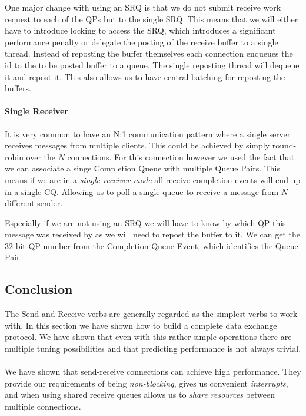 One major change with using an SRQ is that we do not submit receive work request to each of the QPs but to the single SRQ. This
means that we will either have to introduce locking to access the SRQ, which introduces a significant performance penalty or 
delegate the posting of the receive buffer to a single thread. Instead of reposting the buffer themselves each connection 
enqueues the id to the to be posted buffer to a queue. The single reposting thread will dequeue it and repost it. This also
allows us to have central batching for reposting the buffers.

\paragraph{Single Receiver} It is very common to have an N:1 communication pattern where a single server receives messages 
from multiple clients. This could be achieved by simply round-robin over the $N$ connections. For this connection however 
we used the fact that we can associate a singe Completion Queue with multiple Queue Pairs. This means if we are in a
\emph{single receiver mode} all receive completion events will end up in a single CQ. Allowing us to poll a single queue to
receive a message from $N$ different sender.

Especially if we are not using an SRQ we will have to know by which QP this message was received by as we will need to repost
the buffer to it. We can get the 32 bit QP number from the Completion Queue Event, which identifies the Queue Pair. 


\subsection{Conclusion}

The Send and Receive verbs are generally regarded as the simplest verbs to work with. In this section we have shown how to
build a complete data exchange protocol. We have shown that even with this rather simple operations there are multiple tuning
possibilities and that predicting performance  is not always trivial.

\paragraph{} We have shown that send-receive connections can achieve high performance. They provide our requirements of being
\emph{non-blocking}, gives us convenient \emph{interrupts}, and when using shared receive queues allows us to 
\emph{share resources} between multiple  connections.

